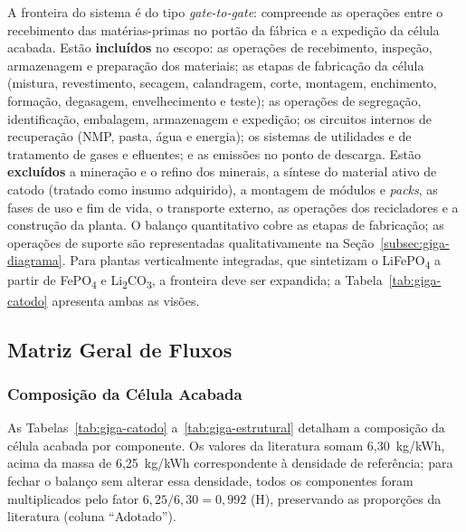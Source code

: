 A fronteira do sistema é do tipo \textit{gate-to-gate}: compreende as operações
entre o recebimento das matérias-primas no portão da fábrica e a expedição da
célula acabada. Estão \textbf{incluídos} no escopo: as operações de recebimento,
inspeção, armazenagem e preparação dos materiais; as etapas de fabricação da
célula (mistura, revestimento, secagem, calandragem, corte, montagem, enchimento,
formação, degasagem, envelhecimento e teste); as operações de segregação,
identificação, embalagem, armazenagem e expedição; os circuitos internos de
recuperação (NMP, pasta, água e energia); os sistemas de utilidades e de
tratamento de gases e efluentes; e as emissões no ponto de descarga. Estão
\textbf{excluídos} a mineração e o refino dos minerais, a síntese do material
ativo de catodo (tratado como insumo adquirido), a montagem de módulos e
\textit{packs}, as fases de uso e fim de vida, o transporte externo, as operações
dos recicladores e a construção da planta. O balanço quantitativo cobre as etapas
de fabricação; as operações de suporte são representadas qualitativamente na
Seção~\ref{subsec:giga-diagrama}. Para plantas verticalmente integradas, que
sintetizam o LiFePO\textsubscript{4} a partir de FePO\textsubscript{4} e
Li\textsubscript{2}CO\textsubscript{3}, a fronteira deve ser expandida; a
Tabela~\ref{tab:giga-catodo} apresenta ambas as visões.

\subsection{Matriz Geral de Fluxos}
\label{subsec:giga-matriz}

\subsubsection{Composição da Célula Acabada}

As Tabelas~\ref{tab:giga-catodo} a~\ref{tab:giga-estrutural} detalham a
composição da célula acabada por componente. Os valores da literatura somam
6,30~kg/kWh, acima da massa de 6,25~kg/kWh correspondente à densidade de
referência; para fechar o balanço sem alterar essa densidade, todos os
componentes foram multiplicados pelo fator $6{,}25/6{,}30 = 0{,}992$ (H),
preservando as proporções da literatura (coluna ``Adotado'').


